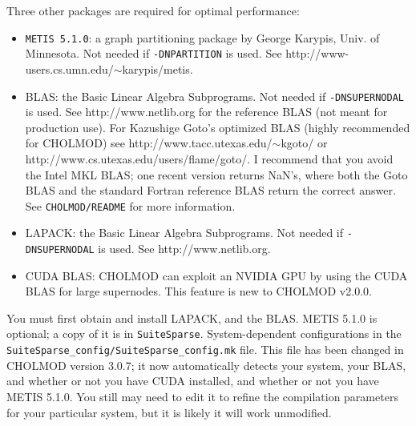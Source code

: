 \documentclass[11pt]{article}
\begin{document}
Three other packages are required for optimal performance:
\begin{itemize}
\item {\tt METIS 5.1.0}: a graph partitioning package by George Karypis,
    Univ. of Minnesota.  Not needed if {\tt -DNPARTITION} is used.
    See http://www-users.cs.umn.edu/$\sim$karypis/metis.
\item BLAS: the Basic Linear Algebra Subprograms.
    Not needed if {\tt -DNSUPERNODAL} is used.
    See http://www.netlib.org for the reference BLAS (not meant for production
    use).  For Kazushige Goto's optimized BLAS (highly recommended for CHOLMOD)
    see \newline
    http://www.tacc.utexas.edu/$\sim$kgoto/ or
    http://www.cs.utexas.edu/users/flame/goto/.
    I recommend that you avoid the Intel MKL BLAS; one recent
    version returns NaN's, where both the Goto BLAS and the standard
    Fortran reference BLAS return the correct answer.
    See {\tt CHOLMOD/README} for more information.
\item LAPACK: the Basic Linear Algebra Subprograms.
    Not needed if {\tt -DNSUPERNODAL} is used.
    See http://www.netlib.org.
\item CUDA BLAS:  CHOLMOD can exploit an NVIDIA GPU by using the CUDA BLAS
    for large supernodes.  This feature is new to CHOLMOD v2.0.0.
\end{itemize}

You must first obtain and install LAPACK, and the BLAS.
METIS 5.1.0 is optional; a copy of it is in {\tt SuiteSparse}.
System-dependent configurations in the
{\tt SuiteSparse\_config/SuiteSparse\_config.mk} file.
This file has been changed in CHOLMOD version 3.0.7;
it now automatically detects your system, your BLAS, and whether or not
you have CUDA installed, and whether or not you have METIS 5.1.0.
You still may need to edit it to refine the
compilation parameters for your particular system, but it is likely it
will work unmodified.
\end{document}
